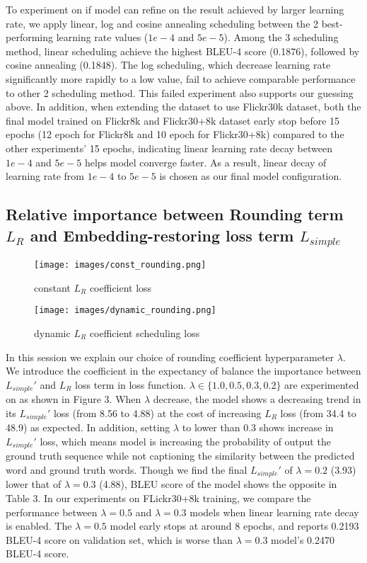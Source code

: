 \documentclass{article}
\begin{document}
To experiment on if model can refine on the result achieved by larger learning rate, we apply linear, log and cosine annealing scheduling between the 2 best-performing learning rate values ($1e-4$ and $5e-5$). Among the 3 scheduling method, linear scheduling achieve the highest BLEU-4 score (0.1876), followed by cosine annealing (0.1848). The log scheduling, which decrease learning rate significantly more rapidly to a low value, fail to achieve comparable performance to other 2 scheduling method. This failed experiment also supports our guessing above. In addition, when extending the dataset to use Flickr30k dataset, both the final model trained on Flickr8k and Flickr30+8k dataset early stop before 15 epochs (12 epoch for Flickr8k and 10 epoch for Flickr30+8k) compared to the other experiments' 15 epochs, indicating linear learning rate decay between $1e-4$ and $5e-5$ helps model converge faster. As a result, linear decay of learning rate from $1e-4$ to $5e-5$ is chosen as our final model configuration. 

\subsection{Relative importance between Rounding term $L_R$ and Embedding-restoring loss term $L_{simple}$}
\label{sec:lambda-exp}
\begin{figure}
  \centering
  \texttt{[image: images/const\_rounding.png]}
  \caption{constant $L_R$ coefficient loss}
  \label{fig:const-lambda}
\end{figure}

\begin{figure}
  \centering
  \texttt{[image: images/dynamic\_rounding.png]}
  \caption{dynamic $L_R$ coefficient scheduling loss}
  \label{fig:dynamic-lambda}
\end{figure}

In this session we explain our choice of rounding coefficient hyperparameter $\lambda$. We introduce the coefficient in the expectancy of balance the importance between $L_{simple}'$ and $L_R$ loss term in loss function. $\lambda \in \{1.0, 0.5, 0.3, 0.2\}$ are experimented on as shown in Figure 3. When $\lambda$ decrease, the model shows a decreasing trend in its $L_{simple}'$ loss (from 8.56 to 4.88) at the cost of increasing $L_R$ loss (from 34.4 to 48.9) as expected. In addition, setting $\lambda$ to lower than 0.3 shows increase in $L_{simple}'$ loss, which means model is increasing the probability of output the ground truth sequence while not captioning the similarity between the predicted word and ground truth words. Though we find the final $L_{simple}'$ of $\lambda = 0.2$ (3.93) lower that of $\lambda = 0.3$ (4.88), BLEU score of the model shows the opposite in Table 3. In our experiments on FLickr30+8k training, we compare the performance between $\lambda = 0.5$ and $\lambda = 0.3$ models when linear learning rate decay is enabled. The $\lambda = 0.5$ model early stops at around 8 epochs, and reports 0.2193 BLEU-4 score on validation set, which is worse than $\lambda = 0.3$ model's 0.2470 BLEU-4 score. 
\end{document}
